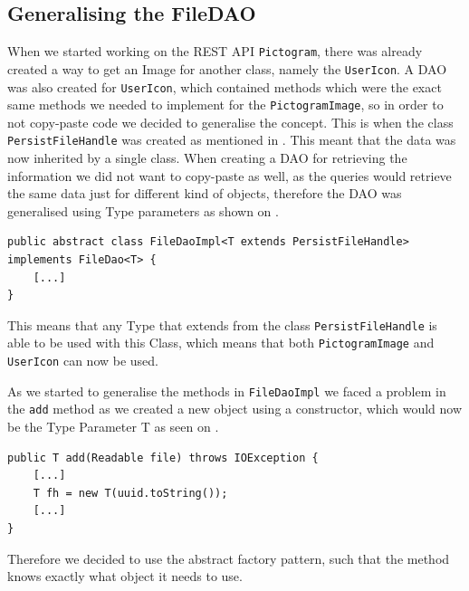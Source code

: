 \subsection{Generalising the FileDAO}\label{subsec:persistfilehandle}
When we started working on the REST API \texttt{Pictogram}, there was already created a way to get an Image for another class, namely the \texttt{UserIcon}.
A DAO was also created for \texttt{UserIcon}, which contained methods which were the exact same methods we needed to implement for the \texttt{PictogramImage}, so in order to not copy-paste code we decided to generalise the concept.
This is when the class \texttt{PersistFileHandle} was created as mentioned in .
This meant that the data was now inherited by a single class.
When creating a DAO for retrieving the information we did not want to copy-paste as well, as the queries would retrieve the same data just for different kind of objects, therefore the DAO was generalised using Type parameters as shown on .


\begin{lstlisting}[float, floatplacement=h, caption={The \texttt{FileDaoImpl} class header which uses Type Parameters to generalise which types it can be used with. \texttt{[...]} denotes omitted code.},label={lst:typeparameter}]
public abstract class FileDaoImpl<T extends PersistFileHandle> implements FileDao<T> {
	[...]
}
\end{lstlisting}

This means that any Type that extends from the class \texttt{PersistFileHandle} is able to be used with this Class, which means that both \texttt{PictogramImage} and \texttt{UserIcon} can now be used.

As we started to generalise the methods in \texttt{FileDaoImpl} we faced a problem in the \texttt{add} method as we created a new object using a constructor, which would now be the Type Parameter T as seen on .

\begin{lstlisting}[float, floatplacement=h, caption={Trying to use a Type Parameter constructor, which Java cannot do. \texttt{[...]} denotes omitted code.},label={lst:TypeParameterConstructor}]
public T add(Readable file) throws IOException {
    [...]
    T fh = new T(uuid.toString());
    [...]
}
\end{lstlisting}

Therefore we decided to use the abstract factory pattern, such that the method knows exactly what object it needs to use.

